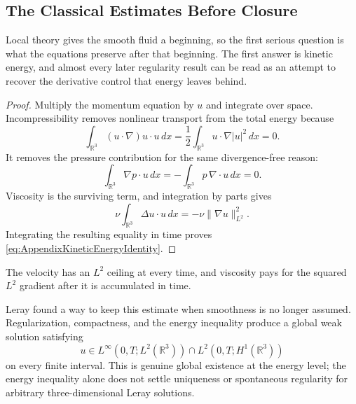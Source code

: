 \subsection{The Classical Estimates Before Closure}\label{sub:HistoricalEstimates}

Local theory gives the smooth fluid a beginning, so the first serious question is what the equations preserve after that beginning.
The first answer is kinetic energy, and almost every later regularity result can be read as an attempt to recover the derivative control that energy leaves behind.


\begin{proof}
Multiply the momentum equation by \(u\) and integrate over space.
Incompressibility removes nonlinear transport from the total energy because
\[
  \int_{\mathbb R^3}(u\cdot\nabla)u\cdot u\,dx
  =
  \frac12\int_{\mathbb R^3}u\cdot\nabla|u|^2\,dx
  =0.
\]
It removes the pressure contribution for the same divergence-free reason:
\[
  \int_{\mathbb R^3}\nabla p\cdot u\,dx
  =
  -\int_{\mathbb R^3}p\,\nabla\cdot u\,dx
  =0.
\]
Viscosity is the surviving term, and integration by parts gives
\[
  \nu\int_{\mathbb R^3}\Delta u\cdot u\,dx
  =
  -\nu\lVert\nabla u\rVert_{L^2}^2.
\]
Integrating the resulting equality in time proves \eqref{eq:AppendixKineticEnergyIdentity}.\qedhere
\end{proof}
The velocity has an \(L^2\) ceiling at every time, and viscosity pays for the squared \(L^2\) gradient after it is accumulated in time.

Leray found a way to keep this estimate when smoothness is no longer assumed.
Regularization, compactness, and the energy inequality produce a global weak solution satisfying \parencite{Leray1934}
\[
  u\in
  L^\infty(0,T;L^2(\mathbb R^3))
  \cap
  L^2(0,T;H^1(\mathbb R^3))
\]
on every finite interval.
This is genuine global existence at the energy level; the energy inequality alone does not settle uniqueness or spontaneous regularity for arbitrary three-dimensional Leray solutions.

